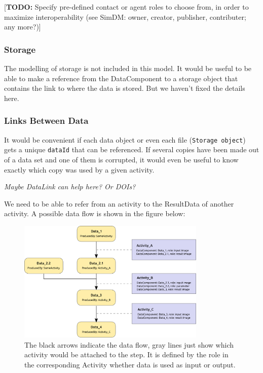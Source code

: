 \documentclass[11pt,a4paper]{ivoa}
\newcommand{\TODO}[1]{\noindent \textcolor{todocolor}{[\textbf{TODO:} #1]}}
\begin{document}
\TODO{Specify pre-defined contact or agent roles to choose from, in order to maximize interoperability (see SimDM: owner, creator, publisher, contributer; any more?)}


\subsubsection{Storage}
The modelling of storage is not included in this model. 
It would be useful to be able to make a reference from the DataComponent to a storage
object that contains the link to where the data is stored. But we haven't fixed the 
details here.


\subsubsection{Links Between Data}\label{sec:links_between_data}
It would be convenient if each data object or even each file (\texttt{Storage object})
gets a unique \texttt{dataId} that can be referenced. If several copies have been
made out of a data set and one of them is corrupted, it would even be useful to know
exactly which copy was used by a given activity. 

\emph{Maybe DataLink can help here? Or DOIs?}

We need to be able to refer from an activity to the ResultData of another
activity. A possible data flow is shown in the figure below:

\begin{figure}
\centering
\includegraphics[width=0.8\textwidth]{ProvDM-activities.png}
\caption{The black arrows indicate the
data flow, gray lines just show which activity would be attached to the step. It
is defined by the role in the corresponding Activity whether data is used as input
or output.}
\label{fig:activities}
\end{figure}
\end{document}

